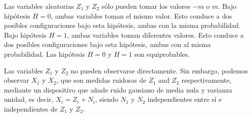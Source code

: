 \ifspanish

\question[30] %

Las variables aleatorias $Z_1$ y $Z_2$ sólo pueden tomar los valores $-m$ o $m$. Bajo hipótesis $H=0$, ambas variables toman el mismo valor. Esto conduce a dos posibles configuraciones bajo esta hipótesis, ambas con la misma probabilidad. Bajo hipótesis $H=1$, ambas variables toman diferentes valores. Esto conduce a dos posibles configuraciones bajo esta hipótesis, ambas con al misma probabilidad. Las hipótesis $H=0$ y $H=1$ son equiprobables.

Las variables $Z_1$ y $Z_2$ no pueden observarse directamente. Sin embargo, podemos observar $X_1$ y $X_2$, que son medidas ruidosas de $Z_1$ and $Z_2$ respectivamente, mediante un dispositivo que añade ruido gausiano de media nula y varianza unidad, es decir, $X_i=Z_i+N_i$, siendo $N_1$ y $N_2$ independientes entre sí e independientes de $Z_1$ y $Z_2$.


